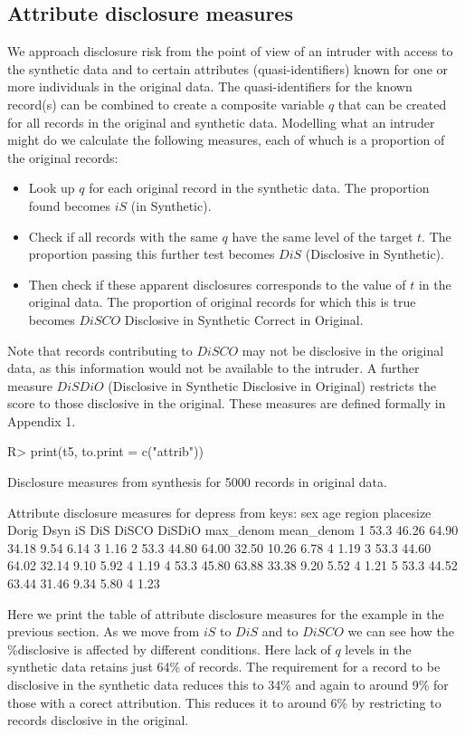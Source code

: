 \documentclass[12pt]{article}
\renewcommand{\baselinestretch}{1.5} %
\begin{document}
\subsection{Attribute disclosure measures}\label{subsec:attrib} 
We approach disclosure risk from the point of view of an intruder with access to the synthetic data
and to certain attributes (quasi-identifiers) known for one or more individuals in the original data.
The quasi-identifiers for the known record(s) can be combined to create a composite variable $q$ that can be created for all records in the original and synthetic data.
Modelling what an intruder might do we calculate the following measures, each of whuch is a proportion of the original records:
\begin{itemize}
\item{Look up $q$ for each original record in the synthetic data. The proportion found becomes $iS$ (in Synthetic).}
\item{Check if all records with the same $q$ have the same level of the target $t$. The proportion passing this further test becomes $DiS$ (Disclosive in Synthetic).}
\item{Then check if these apparent disclosures corresponds to the value of $t$ in the original data. The proportion of original records for which this is true
becomes $DiSCO$ Disclosive in Synthetic Correct in Original.}
\end{itemize}
Note that records contributing to $DiSCO$ may not be disclosive in the original data, as this information would not be available to the intruder. A further measure $DiSDiO$ (Disclosive in Synthetic Disclosive in Original) restricts the score to those disclosive in the original. These measures are defined formally in Appendix 1.
\renewcommand{\baselinestretch}{1.0}
\begin{Schunk}
\begin{Sinput}
R> print(t5, to.print = c("attrib"))
\end{Sinput}
\begin{Soutput}
Disclosure measures from synthesis for 5000 records in original data.

Attribute disclosure measures for depress from keys: sex age region placesize 
  Dorig  Dsyn    iS   DiS DiSCO DiSDiO max_denom mean_denom
1  53.3 46.26 64.90 34.18  9.54   6.14         3       1.16
2  53.3 44.80 64.00 32.50 10.26   6.78         4       1.19
3  53.3 44.60 64.02 32.14  9.10   5.92         4       1.19
4  53.3 45.80 63.88 33.38  9.20   5.52         4       1.21
5  53.3 44.52 63.44 31.46  9.34   5.80         4       1.23
\end{Soutput}
\end{Schunk}
\renewcommand{\baselinestretch}{1.5}
Here we print the table of attribute disclosure measures for the example 
in the previous section.
As we move from $iS$ to $DiS$ and to $DiSCO$  we can see how the \%disclosive is affected by different conditions. Here lack of $q$ levels in the synthetic data retains just 64\% of records. The requirement for a record to be disclosive in
the synthetic data reduces this to 34\% and again to around 9\% for those with a corect attribution. This reduces it to around 6\% by restricting to 
records disclosive in the original.
\end{document}
